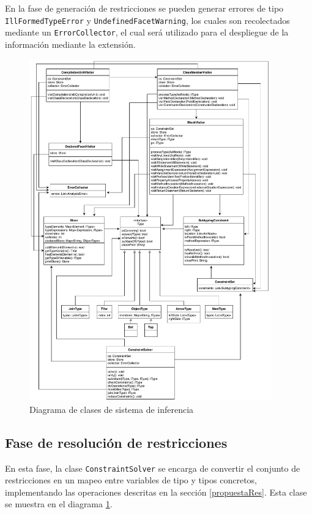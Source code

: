 En la fase de generación de restricciones se pueden generar errores de tipo \texttt{IllFormedTypeError} y \texttt{UndefinedFacetWarning}, los cuales son recolectados mediante un \texttt{ErrorCollector}, el cual será utilizado para el despliegue de la información mediante la extensión.
\clearpage
\begin{figure}[ht]
  \centering
  \includegraphics[width=0.93\textwidth]{imagenes/others.pdf}
  \caption{Diagrama de clases de sistema de inferencia}
  \label{uml}
\end{figure}
\clearpage
\subsection{Fase de resolución de restricciones}
En esta fase, la clase \texttt{ConstraintSolver} se encarga de convertir el conjunto de restricciones en un mapeo entre variables de tipo y tipos concretos, implementando las operaciones descritas en la sección \ref{propuestaRes}. Esta clase se muestra en el diagrama \ref{uml}.

